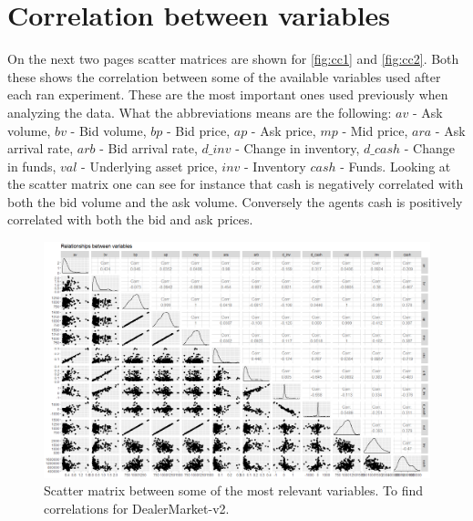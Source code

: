 \documentclass{kththesis}
\theoremstyle{definition}
\begin{document}
\printbibliography[heading=bibintoc] %

\appendix 

\chapter{Correlation between variables}
On the next two pages scatter matrices are shown for \autoref{fig:cc1} and \autoref{fig:cc2}. Both these shows the correlation between some of the available variables used after each ran experiment. These are the most important ones used previously when analyzing the data. What the abbreviations means are the following: $av$ - Ask volume, $bv$ - Bid volume, $bp$ - Bid price, $ap$ - Ask price, $mp$ - Mid price, $ara$ - Ask arrival rate,  $arb$ - Bid arrival rate,  $d\_inv$ - Change in inventory,  $d\_cash$ - Change in funds,  $val$ - Underlying asset price,  $inv$ - Inventory $cash$ - Funds. 
\newline
\newline
Looking at the scatter matrix one can see for instance that cash is negatively correlated with both the bid volume and the ask volume. Conversely the agents cash is positively correlated with both the bid and ask prices. 



\begin{figure}
\centering
\includegraphics[scale=.6]{scatter_mat_vars.png}
\caption{Scatter matrix between some of the most relevant variables. To find correlations for DealerMarket-v2. }
\label{fig:cc1}
\end{figure}    
\end{document}
